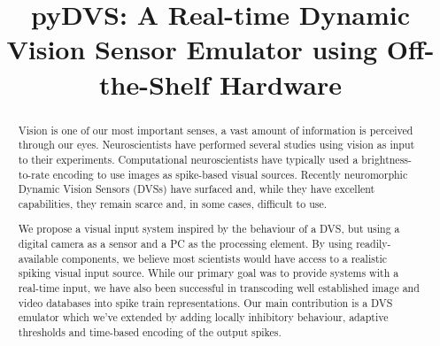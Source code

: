 \documentclass[conference]{IEEEtran}
\begin{document}
\title{pyDVS: A Real-time Dynamic Vision Sensor Emulator using Off-the-Shelf Hardware}
\author{
}


\maketitle
\begin{abstract}
Vision is one of our most important senses, a vast amount of information is perceived through our eyes. Neuroscientists have performed several studies using vision as input to their experiments. Computational neuroscientists have typically used a brightness-to-rate encoding to use images as spike-based visual sources. Recently neuromorphic Dynamic Vision Sensors (DVSs) have surfaced and, while they have excellent capabilities, they remain scarce and, in some cases, difficult to use.

We propose a visual input system inspired by the behaviour of a DVS, but using a digital camera as a sensor and a PC as the processing element. By using readily-available components, we believe most scientists would have access to a realistic spiking visual input source. While our primary goal was to provide systems with a real-time input, we have also been successful in transcoding well established image and video databases into spike train representations. Our main contribution is a DVS emulator which we've extended by adding  locally inhibitory behaviour, adaptive thresholds and time-based encoding of the output spikes.

\end{abstract}
\IEEEpeerreviewmaketitle
\end{document}
